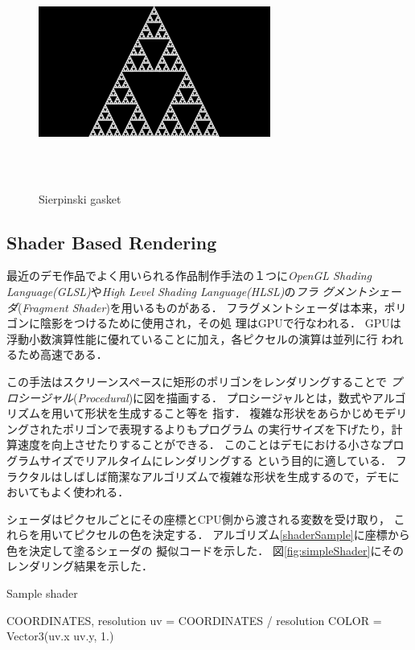 \begin{figure}[htbp]
 \center
 \includegraphics[width=3in, height=3in, keepaspectratio]{../img/fractal/gasket.pdf}
 \caption{Sierpinski gasket}
 \label{fig:gasket}
\end{figure}

\subsection{Shader Based Rendering}

最近のデモ作品でよく用いられる作品制作手法の１つに\textit{OpenGL Shading
Language(GLSL)}や\textit{High Level Shading Language(HLSL)}の\emph{フラ
グメントシェーダ}(\textit{Fragment Shader})を用いるものがある．
フラグメントシェーダは本来，ポリゴンに陰影をつけるために使用され，その処
理はGPUで行なわれる．
GPUは浮動小数演算性能に優れていることに加え，各ピクセルの演算は並列に行
われるため高速である．

この手法はスクリーンスペースに矩形のポリゴンをレンダリングすることで
\emph{プロシージャル}(\textit{Procedural})に図を描画する．
プロシージャルとは，数式やアルゴリズムを用いて形状を生成すること等を
指す．
複雑な形状をあらかじめモデリングされたポリゴンで表現するよりもプログラム
の実行サイズを下げたり，計算速度を向上させたりすることができる． 
このことはデモにおける小さなプログラムサイズでリアルタイムにレンダリングする
という目的に適している．
フラクタルはしばしば簡潔なアルゴリズムで複雑な形状を生成するので，デモに
おいてもよく使われる．

シェーダはピクセルごとにその座標とCPU側から渡される変数を受け取り，
これらを用いてピクセルの色を決定する．
アルゴリズム\ref{shaderSample}に座標から色を決定して塗るシェーダの
擬似コードを示した．
図\ref{fig:simpleShader}にそのレンダリング結果を示した．
\begin{algorithm}
 \begin{algorithmic}
  \begin{minipage}{0.5\hsize}
   \caption{Sample shader}
   \label{shaderSample}
   \REQUIRE COORDINATES, resolution
   \STATE uv = COORDINATES / resolution
   \STATE COLOR = Vector3(uv.x uv.y, 1.)
  \end{minipage}
 \end{algorithmic}
\end{algorithm}


